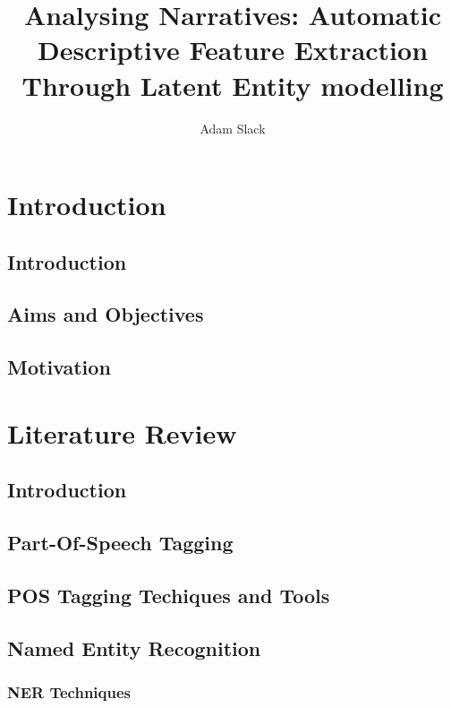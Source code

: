 \documentclass[12pt, letterpaper, twoside]{report}
\title{Analysing Narratives: Automatic Descriptive Feature Extraction Through Latent Entity modelling}
\author{Adam Slack}
\date{}
\begin{document}
 
\begin{titlepage}
\maketitle
\end{titlepage}

\tableofcontents
\chapter{Introduction}
\section{Introduction}

\section{Aims and Objectives}

\section{Motivation}


\chapter{Literature Review}

\section{Introduction}

\section{Part-Of-Speech Tagging}

\section{POS Tagging Techiques and Tools}

\section{Named Entity Recognition}

\subsection{NER Techniques}
\end{document}
